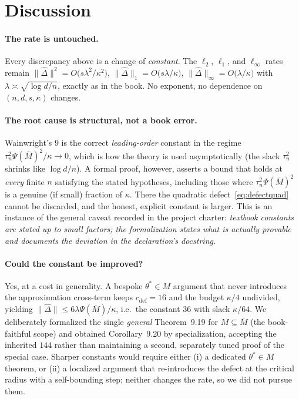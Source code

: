 \documentclass[11pt]{article}
\theoremstyle{definition}
\newcommand{\thetast}{\theta^{*}}
\newcommand{\Mbar}{\overline{M}}
\newcommand{\PsM}{\Psi(\Mbar)}
\newcommand{\norm}[1]{\lVert #1 \rVert}
\begin{document}
\section{Discussion}\label{sec:disc}

\paragraph{The rate is untouched.} Every discrepancy above is a change of \emph{constant}. The
$\ell_2$, $\ell_1$, and $\ell_\infty$ rates remain
$\norm{\widehat\Delta}^2 = O\!\big(s\lambda^2/\kappa^2\big)$,
$\norm{\widehat\Delta}_1 = O\!\big(s\lambda/\kappa\big)$,
$\norm{\widehat\Delta}_\infty = O\!\big(\lambda/\kappa\big)$ with
$\lambda\asymp\sqrt{\log d/n}$, exactly as in the book. No exponent, no dependence on $(n,d,s,\kappa)$
changes.

\paragraph{The root cause is structural, not a book error.} Wainwright's $9$ is the correct
\emph{leading-order} constant in the regime $\tau_n^2\PsM^2/\kappa\to0$, which is how the theory is used
asymptotically (the slack $\tau_n^2$ shrinks like $\log d/n$). A formal proof, however, asserts a bound
that holds at \emph{every} finite $n$ satisfying the stated hypotheses, including those where
$\tau_n^2\PsM^2$ is a genuine (if small) fraction of $\kappa$. There the quadratic defect~\eqref{eq:defectquad}
cannot be discarded, and the honest, explicit constant is larger. This is an instance of the general
caveat recorded in the project charter: \emph{textbook constants are stated up to small factors; the
formalization states what is actually provable and documents the deviation in the declaration's
docstring.}

\paragraph{Could the constant be improved?} Yes, at a cost in generality. A bespoke $\thetast\in M$
argument that never introduces the approximation cross-term keeps $c_{\mathrm{def}}=16$ and the budget
$\kappa/4$ undivided, yielding $\norm{\widehat\Delta}\le 6\lambda\PsM/\kappa$, i.e.\ the constant $36$
with slack $\kappa/64$. We deliberately formalized the single \emph{general} Theorem~9.19 for
$M\subseteq\Mbar$ (the book-faithful scope) and obtained Corollary~9.20 by specialization, accepting the
inherited $144$ rather than maintaining a second, separately tuned proof of the special case. Sharper
constants would require either (i) a dedicated $\thetast\in M$ theorem, or (ii) a localized argument that
re-introduces the defect at the critical radius with a self-bounding step; neither changes the rate, so
we did not pursue them.
\end{document}
